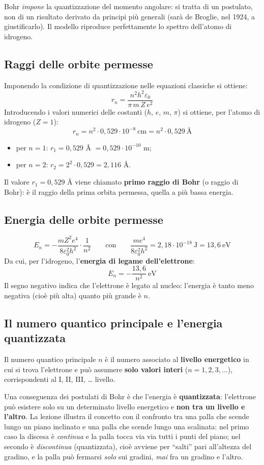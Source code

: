 \documentclass[11pt, a4paper, openright]{book}
\begin{document}
Bohr \emph{impone} la quantizzazione del momento angolare: si tratta di un postulato, non di un risultato derivato da principi più generali (sarà de Broglie, nel 1924, a giustificarlo). Il modello riproduce perfettamente lo spettro dell'atomo di idrogeno.

\subsection{Raggi delle orbite permesse}
Imponendo la condizione di quantizzazione nelle equazioni classiche si ottiene:
\[
r_{n} = \frac{n^{2} h^{2} \varepsilon_{0}}{\pi\, m\, Z\, e^{2}}
\]
Introducendo i valori numerici delle costanti ($h$, $e$, $m$, $\pi$) si ottiene, per l'atomo di idrogeno ($Z = 1$):
\[
r_{n} = n^{2} \cdot 0{,}529 \cdot 10^{-8}\ \mathrm{cm} = n^{2} \cdot 0{,}529\ \text{\AA}
\]
\begin{itemize}
    \item per $n = 1$: $r_1 = 0{,}529$ \AA{} $= 0{,}529 \cdot 10^{-10}$ m;
    \item per $n = 2$: $r_2 = 2^2 \cdot 0{,}529 = 2{,}116$ \AA.
\end{itemize}
Il valore $r_1 = 0{,}529$ \AA{} viene chiamato \textbf{primo raggio di Bohr} (o raggio di Bohr): è il raggio della prima orbita permessa, quella a più bassa energia.

\subsection{Energia delle orbite permesse}
\[
E_{n} = -\frac{m Z^{2} e^{4}}{8\varepsilon_{0}^{2} h^{2}}\cdot\frac{1}{n^{2}}
\qquad\text{con}\qquad
\frac{m e^{4}}{8\varepsilon_{0}^{2} h^{2}} = 2{,}18 \cdot 10^{-18}\ \mathrm{J} = 13{,}6\ \mathrm{eV}
\]
Da cui, per l'idrogeno, l'\textbf{energia di legame dell'elettrone}:
\[
E_{n} = -\frac{13{,}6}{n^{2}}\ \mathrm{eV}
\]
Il segno negativo indica che l'elettrone è legato al nucleo: l'energia è tanto meno negativa (cioè più alta) quanto più grande è $n$.

\subsection{Il numero quantico principale e l'energia quantizzata}
Il numero quantico principale $n$ è il numero associato al \textbf{livello energetico} in cui si trova l'elettrone e può assumere \textbf{solo valori interi} ($n = 1, 2, 3, \dots$), corrispondenti al I, II, III, \dots{} livello.

Una conseguenza dei postulati di Bohr è che l'energia è \textbf{quantizzata}: l'elettrone può esistere solo su un determinato livello energetico e \textbf{non tra un livello e l'altro}. La lezione illustra il concetto con il confronto tra una palla che scende lungo un piano inclinato e una palla che scende lungo una scalinata: nel primo caso la discesa è \emph{continua} e la palla tocca via via tutti i punti del piano; nel secondo è \emph{discontinua} (quantizzata), cioè avviene per ``salti'' pari all'altezza del gradino, e la palla può fermarsi \emph{solo} sui gradini, \emph{mai} fra un gradino e l'altro.
\end{document}
